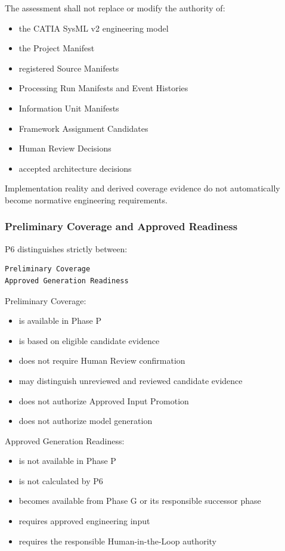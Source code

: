 The assessment shall not replace or modify the authority of:

\begin{itemize}
\tightlist
\item
  the CATIA SysML v2 engineering model
\item
  the Project Manifest
\item
  registered Source Manifests
\item
  Processing Run Manifests and Event Histories
\item
  Information Unit Manifests
\item
  Framework Assignment Candidates
\item
  Human Review Decisions
\item
  accepted architecture decisions
\end{itemize}

Implementation reality and derived coverage evidence do not automatically become normative engineering requirements.

\hypertarget{preliminary-coverage-and-approved-readiness}{%
\subsubsection{Preliminary Coverage and Approved Readiness}\label{preliminary-coverage-and-approved-readiness}}

P6 distinguishes strictly between:

\begin{verbatim}
Preliminary Coverage
Approved Generation Readiness
\end{verbatim}

Preliminary Coverage:

\begin{itemize}
\tightlist
\item
  is available in Phase P
\item
  is based on eligible candidate evidence
\item
  does not require Human Review confirmation
\item
  may distinguish unreviewed and reviewed candidate evidence
\item
  does not authorize Approved Input Promotion
\item
  does not authorize model generation
\end{itemize}

Approved Generation Readiness:

\begin{itemize}
\tightlist
\item
  is not available in Phase P
\item
  is not calculated by P6
\item
  becomes available from Phase G or its responsible successor phase
\item
  requires approved engineering input
\item
  requires the responsible Human-in-the-Loop authority
\end{itemize}

